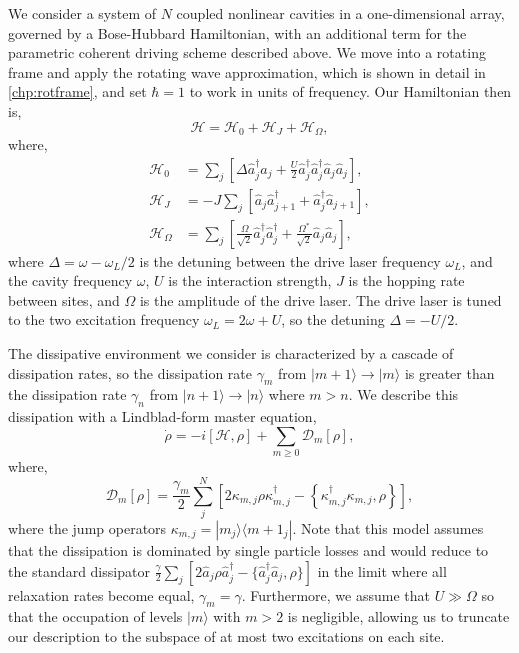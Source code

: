 We consider a system of \(N\) coupled nonlinear cavities in a one-dimensional array, governed by a Bose-Hubbard Hamiltonian, with an additional term for the parametric coherent driving scheme described above. We move into a rotating frame and apply the rotating wave approximation, which is shown in detail in \cref{chp:rotframe}, and set \(\hbar = 1\) to work in units of frequency. Our Hamiltonian then is,
\begin{equation}
	\mathcal{H} = \mathcal{H}_{0} + \mathcal{H}_{J} + \mathcal{H}_{\Omega},
	\label{eq:dnlca2-1}
\end{equation}
where,
\begin{align}
	\mathcal{H}_{0} &= \sum_{j} \left[ \Delta \hat{a}_{j}^{\dagger}\hat{a}_{j} + \frac{U}{2}\hat{a}_{j}^{\dagger}\hat{a}_{j}^{\dagger}\hat{a}_{j}\hat{a}_{j}\right], \label{eq:dnlca2-2} \\
	\mathcal{H}_{J} &= -J \sum_{j}\left[ \hat{a}_{j}\hat{a}_{j+1}^{\dagger} + \hat{a}_{j}^{\dagger}\hat{a}_{j+1} \right], \label{eq:dnlca2-3} \\
	\mathcal{H}_{\Omega} &= \sum_{j} \left[\frac{\Omega}{\sqrt{2}}\hat{a}_{j}^{\dagger}\hat{a}_{j}^{\dagger} + \frac{\Omega^{*}}{\sqrt{2}}\hat{a}_{j}\hat{a}_{j} \right], \label{eq:dnlca2-4}
\end{align}
where \(\Delta = \omega - \omega_{L}/2\) is the detuning between the drive laser frequency \(\omega_{L}\), and the cavity frequency \(\omega\), \(U\) is the interaction strength, \(J\) is the hopping rate between sites, and \(\Omega\) is the amplitude of the drive laser. The drive laser is tuned to the two excitation frequency \(\omega_{L} = 2\omega + U\), so the detuning \(\Delta = -U/2\).

The dissipative environment we consider is characterized by a cascade of dissipation rates, so the dissipation rate \(\gamma_{m}\) from \(|m+1\rangle \rightarrow |m\rangle\) is greater than the dissipation rate \(\gamma_{n}\) from \(|n+1\rangle \rightarrow |n\rangle\) where \(m > n\). We describe this dissipation with a Lindblad-form master equation,
\begin{equation}
	\dot{\rho} = -i\left[\mathcal{H}, \rho\right] + \sum_{m \geq 0} \mathcal{D}_{m}[\rho],
	\label{eq:dnlca2-5}
\end{equation}
where,
\begin{equation}
	\mathcal{D}_{m} [\rho] = \frac{\gamma_{m}}{2} \sum_{j}^{N} \left[ 2\kappa_{m,j}\rho\kappa_{m,j}^{\dagger} - \left\{\kappa_{m,j}^{\dagger}\kappa_{m,j}, \rho \right\}\right],
	\label{eq:dnlca2-6}
\end{equation}
where the jump operators \(\kappa_{m,j} = |m_{j} \rangle \langle m+1_{j}|\). Note that this model assumes that the dissipation is dominated by single particle losses and would reduce to the standard dissipator \(\frac{\gamma}{2} \sum_{j}\left[2\hat{a}_{j}\rho\hat{a}_{j}^{\dagger} - \{\hat{a}_{j}^{\dagger}\hat{a}_{j}, \rho\}\right]\) in the limit where all relaxation rates become equal, \(\gamma_{m} = \gamma\). Furthermore, we assume that \(U \gg \Omega\) so that the occupation of levels \(|m\rangle\) with \(m > 2\) is negligible, allowing us to truncate our description to the subspace of at most two excitations on each site.

